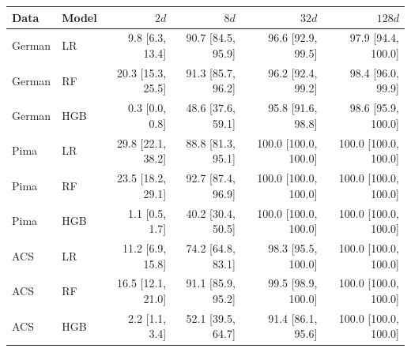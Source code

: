 \begin{tabular}{llrrrr}
\toprule
Data & Model & $2d$ & $8d$ & $32d$ & $128d$ \\
\midrule
German & LR & 9.8 [6.3, 13.4] & 90.7 [84.5, 95.9] & 96.6 [92.9, 99.5] & 97.9 [94.4, 100.0] \\
German & RF & 20.3 [15.3, 25.5] & 91.3 [85.7, 96.2] & 96.2 [92.4, 99.2] & 98.4 [96.0, 99.9] \\
German & HGB & 0.3 [0.0, 0.8] & 48.6 [37.6, 59.1] & 95.8 [91.6, 98.8] & 98.6 [95.9, 100.0] \\
Pima & LR & 29.8 [22.1, 38.2] & 88.8 [81.3, 95.1] & 100.0 [100.0, 100.0] & 100.0 [100.0, 100.0] \\
Pima & RF & 23.5 [18.2, 29.1] & 92.7 [87.4, 96.9] & 100.0 [100.0, 100.0] & 100.0 [100.0, 100.0] \\
Pima & HGB & 1.1 [0.5, 1.7] & 40.2 [30.4, 50.5] & 100.0 [100.0, 100.0] & 100.0 [100.0, 100.0] \\
ACS & LR & 11.2 [6.9, 15.8] & 74.2 [64.8, 83.1] & 98.3 [95.5, 100.0] & 100.0 [100.0, 100.0] \\
ACS & RF & 16.5 [12.1, 21.0] & 91.1 [85.9, 95.2] & 99.5 [98.9, 100.0] & 100.0 [100.0, 100.0] \\
ACS & HGB & 2.2 [1.1, 3.4] & 52.1 [39.5, 64.7] & 91.4 [86.1, 95.6] & 100.0 [100.0, 100.0] \\
\bottomrule
\end{tabular}